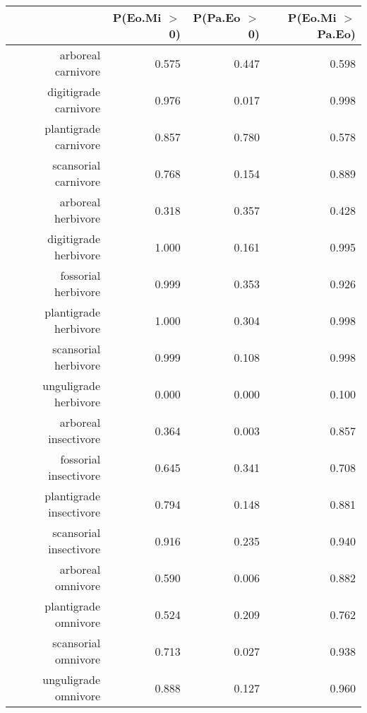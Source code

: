 \begin{table}[ht]
\centering
\begin{tabular}{rrrr}
  \hline
 & P(Eo.Mi $>$ 0) & P(Pa.Eo $>$ 0) & P(Eo.Mi $>$ Pa.Eo) \\ 
  \hline
arboreal carnivore & 0.575 & 0.447 & 0.598 \\ 
  digitigrade carnivore & 0.976 & 0.017 & 0.998 \\ 
  plantigrade carnivore & 0.857 & 0.780 & 0.578 \\ 
  scansorial carnivore & 0.768 & 0.154 & 0.889 \\ 
  arboreal herbivore & 0.318 & 0.357 & 0.428 \\ 
  digitigrade herbivore & 1.000 & 0.161 & 0.995 \\ 
  fossorial herbivore & 0.999 & 0.353 & 0.926 \\ 
  plantigrade herbivore & 1.000 & 0.304 & 0.998 \\ 
  scansorial herbivore & 0.999 & 0.108 & 0.998 \\ 
  unguligrade herbivore & 0.000 & 0.000 & 0.100 \\ 
  arboreal insectivore & 0.364 & 0.003 & 0.857 \\ 
  fossorial insectivore & 0.645 & 0.341 & 0.708 \\ 
  plantigrade insectivore & 0.794 & 0.148 & 0.881 \\ 
  scansorial insectivore & 0.916 & 0.235 & 0.940 \\ 
  arboreal omnivore & 0.590 & 0.006 & 0.882 \\ 
  plantigrade omnivore & 0.524 & 0.209 & 0.762 \\ 
  scansorial omnivore & 0.713 & 0.027 & 0.938 \\ 
  unguligrade omnivore & 0.888 & 0.127 & 0.960 \\ 
   \hline
\end{tabular}
\label{tab:origin_plant}
\end{table}
